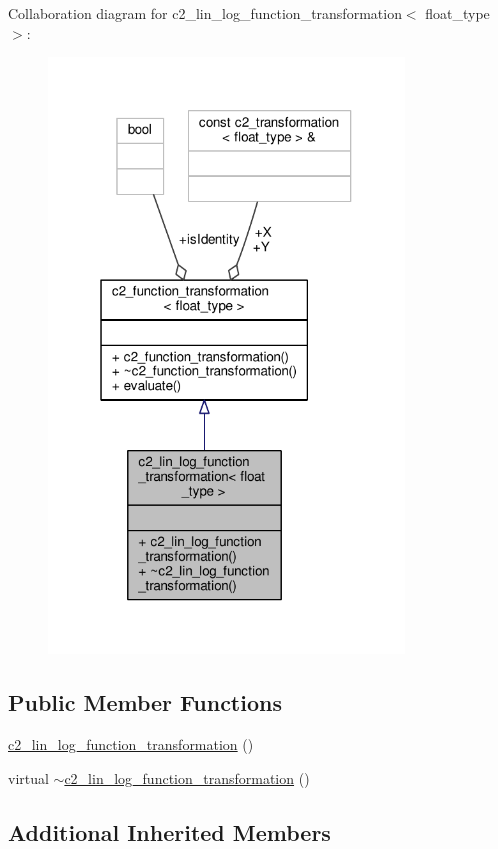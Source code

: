 Collaboration diagram for c2\+\_\+lin\+\_\+log\+\_\+function\+\_\+transformation$<$ float\+\_\+type $>$\+:
\nopagebreak
\begin{figure}[H]
\begin{center}
\leavevmode
\includegraphics[width=268pt]{classc2__lin__log__function__transformation__coll__graph}
\end{center}
\end{figure}
\subsection*{Public Member Functions}
\begin{DoxyCompactItemize}
\item 
\hyperlink{classc2__lin__log__function__transformation_ac37bc1e464ecf93b21a9b47a8839d1ea}{c2\+\_\+lin\+\_\+log\+\_\+function\+\_\+transformation} ()
\item 
virtual \hyperlink{classc2__lin__log__function__transformation_a12ef189ce688be24d4ce7699e20d3c0b}{$\sim$c2\+\_\+lin\+\_\+log\+\_\+function\+\_\+transformation} ()
\end{DoxyCompactItemize}
\subsection*{Additional Inherited Members}


